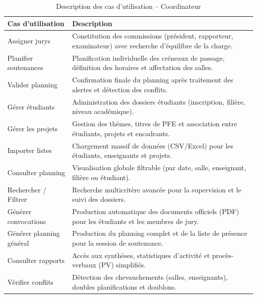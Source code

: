 \documentclass[12pt,a4paper]{article}
\begin{document}
\begin{table}[H]
    \centering
    \small
    \begin{tabular}{lp{10cm}}
        \toprule
        \rowcolor{primary!10}
        \textbf{Cas d'utilisation} & \textbf{Description}                                                                                       \\
        \midrule
        Assigner jurys             & Constitution des commissions (président, rapporteur, examinateur) avec recherche d'équilibre de la charge. \\
        \addlinespace
        Planifier soutenances      & Planification individuelle des créneaux de passage, définition des horaires et affectation des salles.     \\
        \addlinespace
        Valider planning           & Confirmation finale du planning après traitement des alertes et détection des conflits.                    \\
        \addlinespace
        Gérer étudiants            & Administration des dossiers étudiants (inscription, filière, niveau académique).                           \\
        \addlinespace
        Gérer les projets          & Gestion des thèmes, titres de PFE et association entre étudiants, projets et encadrants.                   \\
        \addlinespace
        Importer listes            & Chargement massif de données (CSV/Excel) pour les étudiants, enseignants et projets.                       \\
        \addlinespace
        Consulter planning         & Visualisation globale filtrable (par date, salle, enseignant, filière ou étudiant).                        \\
        \addlinespace
        Rechercher / Filtrer       & Recherche multicritère avancée pour la supervision et le suivi des dossiers.                               \\
        \addlinespace
        Générer convocations       & Production automatique des documents officiels (PDF) pour les étudiants et les membres de jury.            \\
        \addlinespace
        Générer planning général   & Production du planning complet et de la liste de présence pour la session de soutenance.                   \\
        \addlinespace
        Consulter rapports         & Accès aux synthèses, statistiques d'activité et procès-verbaux (PV) simplifiés.                            \\
        \addlinespace
        Vérifier conflits          & Détection des chevauchements (salles, enseignants), doubles planifications et doublons.                    \\
        \bottomrule
    \end{tabular}
    \caption{Description des cas d'utilisation -- Coordinateur}
\end{table}
\end{document}
